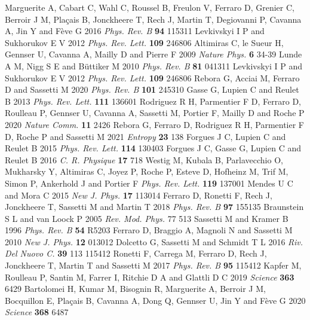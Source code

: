 \documentclass[12pt]{iopart}
\begin{document}
\begin{thebibliography}{999}
%
 Marguerite A, Cabart C, Wahl C, Roussel B, Freulon V, Ferraro D, Grenier C, Berroir J M, Plaçais B, Jonckheere T, Rech J, Martin T, Degiovanni P, Cavanna A, Jin Y and Fève G 2016 \emph{Phys. Rev. B} \textbf{94} 115311
%
 Levkivskyi I P and Sukhorukov E V 2012 \emph{Phys. Rev. Lett.} \textbf{109} 246806
%
 Altimiras C, le Sueur H, Gennser U, Cavanna A, Mailly D and Pierre F 2009 \emph{Nature Phys.} \textbf{6} 34-39
%
 Lunde A M, Nigg S E and Büttiker M 2010 \emph{Phys. Rev. B} \textbf{81} 041311
%
 Levkivskyi I P and Sukhorukov E V 2012 \emph{Phys. Rev. Lett.} \textbf{109} 246806
%
 Rebora G, Acciai M, Ferraro D and Sassetti M 2020 \emph{Phys. Rev. B} \textbf{101} 245310
%
 Gasse G, Lupien C and Reulet B 2013 \emph{Phys. Rev. Lett.} \textbf{111} 136601
%
 Rodriguez R H, Parmentier F D, Ferraro D, Roulleau P, Gennser U, Cavanna A, Sassetti M, Portier F, Mailly D and Roche P 2020 {\em Nature Comm.} \textbf {11} 2426
%
 Rebora G, Ferraro D, Rodriguez R H, Parmentier F D, Roche P and Sassetti M 2021 \emph{Entropy} \textbf{23} 138
%
 Forgues J C, Lupien C and Reulet B 2015 \emph{Phys. Rev. Lett.} \textbf{114} 130403
%
 Forgues J C, Gasse G, Lupien C and Reulet B 2016 \emph{C. R. Physique} \textbf{17} 718
%
 Westig M, Kubala B, Parlavecchio O, Mukharsky Y, Altimiras C, Joyez P, Roche P, Esteve D, Hofheinz M, Trif M, Simon P, Ankerhold J and Portier F \emph{Phys. Rev. Lett.} \textbf{119} 137001
%
 Mendes U C and Mora C 2015 \emph{New J. Phys.} \textbf{17} 113014
%
 Ferraro D, Ronetti F, Rech J, Jonckheere T, Sassetti M and Martin T 2018 \emph{Phys. Rev. B} \textbf{97} 155135
%
 Braunstein S L and van Loock P 2005 \emph{Rev. Mod. Phys.} 77 513
%
 Sassetti M and Kramer B 1996 \emph{Phys. Rev. B} \textbf{54} R5203
%
 Ferraro D, Braggio A, Magnoli N and Sassetti M 2010 \emph{New J. Phys.} \textbf{12} 013012
%
 Dolcetto G, Sassetti M and Schmidt T L 2016 \emph{Riv. Del Nuovo C.} \textbf{39} 113 115412
%
 Ronetti F, Carrega M, Ferraro D, Rech J, Jonckheere T, Martin T and Sassetti M 2017
\emph{Phys. Rev. B} \textbf{95} 115412
%
 Kapfer M, Roulleau P, Santin M, Farrer I,  Ritchie D A and Glattli D C 2019 \emph{Science} \textbf{363} 6429
%
 Bartolomei H, Kumar M, Bisognin R, Marguerite A, Berroir J M, Bocquillon E, Plaçais B, Cavanna A, Dong Q, Gennser U, Jin Y and Fève G 2020 \emph{Science} \textbf{368} 6487

\end{thebibliography}
\end{document}
